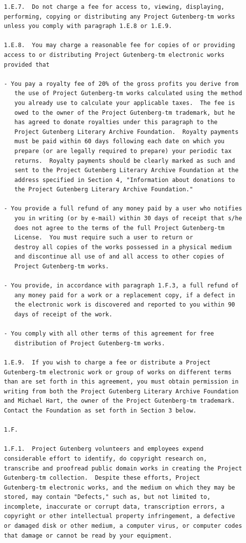 \documentclass[a4paper,12pt]{book}[2004/02/16]
\theoremstyle{ilemma}
\theoremstyle{itheorem}
\theoremstyle{iother}
\theoremstyle{icorollary}
\theoremstyle{numcorollary}
\theoremstyle{idefinition}
\begin{document}
\begin{verbatim}
1.E.7.  Do not charge a fee for access to, viewing, displaying,
performing, copying or distributing any Project Gutenberg-tm works
unless you comply with paragraph 1.E.8 or 1.E.9.

1.E.8.  You may charge a reasonable fee for copies of or providing
access to or distributing Project Gutenberg-tm electronic works
provided that

- You pay a royalty fee of 20% of the gross profits you derive from
   the use of Project Gutenberg-tm works calculated using the method
   you already use to calculate your applicable taxes.  The fee is
   owed to the owner of the Project Gutenberg-tm trademark, but he
   has agreed to donate royalties under this paragraph to the
   Project Gutenberg Literary Archive Foundation.  Royalty payments
   must be paid within 60 days following each date on which you
   prepare (or are legally required to prepare) your periodic tax
   returns.  Royalty payments should be clearly marked as such and
   sent to the Project Gutenberg Literary Archive Foundation at the
   address specified in Section 4, "Information about donations to
   the Project Gutenberg Literary Archive Foundation."

- You provide a full refund of any money paid by a user who notifies
   you in writing (or by e-mail) within 30 days of receipt that s/he
   does not agree to the terms of the full Project Gutenberg-tm
   License.  You must require such a user to return or
   destroy all copies of the works possessed in a physical medium
   and discontinue all use of and all access to other copies of
   Project Gutenberg-tm works.

- You provide, in accordance with paragraph 1.F.3, a full refund of
   any money paid for a work or a replacement copy, if a defect in
   the electronic work is discovered and reported to you within 90
   days of receipt of the work.

- You comply with all other terms of this agreement for free
   distribution of Project Gutenberg-tm works.

1.E.9.  If you wish to charge a fee or distribute a Project
Gutenberg-tm electronic work or group of works on different terms
than are set forth in this agreement, you must obtain permission in
writing from both the Project Gutenberg Literary Archive Foundation
and Michael Hart, the owner of the Project Gutenberg-tm trademark.
Contact the Foundation as set forth in Section 3 below.

1.F.

1.F.1.  Project Gutenberg volunteers and employees expend
considerable effort to identify, do copyright research on,
transcribe and proofread public domain works in creating the Project
Gutenberg-tm collection.  Despite these efforts, Project
Gutenberg-tm electronic works, and the medium on which they may be
stored, may contain "Defects," such as, but not limited to,
incomplete, inaccurate or corrupt data, transcription errors, a
copyright or other intellectual property infringement, a defective
or damaged disk or other medium, a computer virus, or computer codes
that damage or cannot be read by your equipment.


\end{verbatim}
\end{document}
